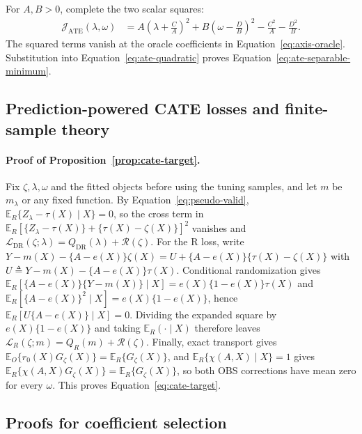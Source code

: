 For $A,B>0$, complete the two scalar squares:
\begin{align*}
\mathcal J_{\mathrm{ATE}}(\lambda,\omega)
&=
A\left(\lambda+\frac CA\right)^2
+B\left(\omega-\frac DB\right)^2
-\frac{C^2}{A}-\frac{D^2}{B}.
\end{align*}
The squared terms vanish at the oracle coefficients in
Equation~\eqref{eq:axis-oracle}. Substitution into
Equation~\eqref{eq:ate-quadratic} proves
Equation~\eqref{eq:ate-separable-minimum}.

\subsection{Prediction-powered CATE losses and finite-sample theory}


\paragraph{Proof of Proposition~\ref{prop:cate-target}.}
Fix $\zeta,\lambda,\omega$ and the fitted objects before using the tuning samples, and let $m$ be $m_\lambda$ or any fixed function. By Equation~\eqref{eq:pseudo-valid}, $\mathbb E_R\{Z_\lambda-\tau(X)\mid X\}=0$, so the cross term in $\mathbb E_R[\{Z_\lambda-\tau(X)\}+\{\tau(X)-\zeta(X)\}]^2$ vanishes and $\mathcal L_{\mathrm{DR}}(\zeta;\lambda)=Q_{\mathrm{DR}}(\lambda)+\mathcal R(\zeta)$. For the R loss, write $Y-m(X)-\{A-e(X)\}\zeta(X)=U+\{A-e(X)\}\{\tau(X)-\zeta(X)\}$ with $U\triangleq Y-m(X)-\{A-e(X)\}\tau(X)$. Conditional randomization gives $\mathbb E_R[\{A-e(X)\}\{Y-m(X)\}\mid X]=e(X)\{1-e(X)\}\tau(X)$ and $\mathbb E_R[\{A-e(X)\}^2\mid X]=e(X)\{1-e(X)\}$, hence $\mathbb E_R[U\{A-e(X)\}\mid X]=0$. Dividing the expanded square by $e(X)\{1-e(X)\}$ and taking $\mathbb E_R(\cdot\mid X)$ therefore leaves $\mathcal L_R(\zeta;m)=Q_R(m)+\mathcal R(\zeta)$. Finally, exact transport gives $\mathbb E_O\{r_0(X)G_\zeta(X)\}=\mathbb E_R\{G_\zeta(X)\}$, and $\mathbb E_R\{\chi(A,X)\mid X\}=1$ gives $\mathbb E_R\{\chi(A,X)G_\zeta(X)\}=\mathbb E_R\{G_\zeta(X)\}$, so both OBS corrections have mean zero for every $\omega$. This proves Equation~\eqref{eq:cate-target}.


\subsection{Proofs for coefficient selection}

